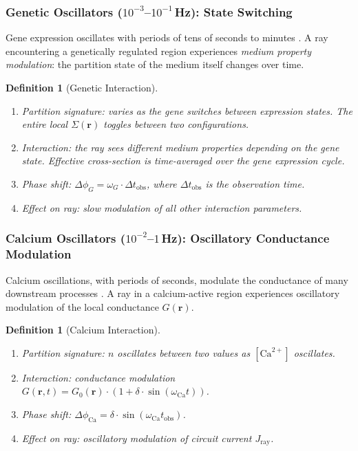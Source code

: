 \documentclass[11pt,twocolumn,a4paper]{article}
\newtheorem{definition}[theorem]{Definition}
\newcommand{\Jray}{J_{\mathrm{ray}}}
\begin{document}
\subsubsection{Genetic Oscillators ($10^{-3}$--$10^{-1}$\,Hz):
State Switching}

Gene expression oscillates with periods of tens of seconds to minutes
\citep{reppert2002}. A ray encountering a genetically regulated region
experiences \emph{medium property modulation}: the partition state of
the medium itself changes over time.

\begin{definition}[Genetic Interaction]
\label{def:genetic-interaction}
\begin{enumerate}[label=(\alph*),leftmargin=*]
\item \textit{Partition signature:} varies as the gene switches between
  expression states. The entire local $\Sigma(\mathbf{r})$ toggles
  between two configurations.
\item \textit{Interaction:} the ray sees different medium properties
  depending on the gene state. Effective cross-section is
  time-averaged over the gene expression cycle.
\item \textit{Phase shift:} $\Delta\phi_G = \omega_G \cdot
  \Delta t_{\mathrm{obs}}$, where $\Delta t_{\mathrm{obs}}$ is the
  observation time.
\item \textit{Effect on ray:} slow modulation of all other interaction
  parameters.
\end{enumerate}
\end{definition}

\subsubsection{Calcium Oscillators ($10^{-2}$--$1$\,Hz):
Oscillatory Conductance Modulation}

Calcium oscillations, with periods of seconds, modulate the
conductance of many downstream processes \citep{berridge1998}.
A ray in a calcium-active region experiences oscillatory modulation
of the local conductance $G(\mathbf{r})$.

\begin{definition}[Calcium Interaction]
\label{def:calcium-interaction}
\begin{enumerate}[label=(\alph*),leftmargin=*]
\item \textit{Partition signature:} $n$ oscillates between two values
  as $[\text{Ca}^{2+}]$ oscillates.
\item \textit{Interaction:} conductance modulation
  $G(\mathbf{r}, t) = G_0(\mathbf{r}) \cdot (1 + \delta \cdot
  \sin(\omega_{\mathrm{Ca}} t))$.
\item \textit{Phase shift:}
  $\Delta\phi_{\mathrm{Ca}} = \delta \cdot
  \sin(\omega_{\mathrm{Ca}} t_{\mathrm{obs}})$.
\item \textit{Effect on ray:} oscillatory modulation of circuit
  current $\Jray$.
\end{enumerate}
\end{definition}
\end{document}

